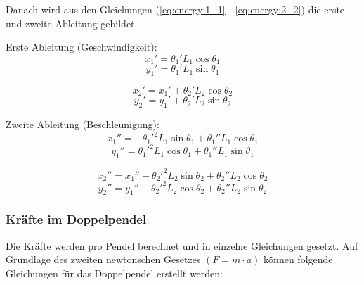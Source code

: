 \documentclass[12pt]{article}
\numberwithin{equation}{subsection}
\begin{document}
Danach wird aus den Gleichungen (\ref{eq:energy:1_1} - \ref{eq:energy:2_2}) die erste und zweite Ableitung gebildet.

Erste Ableitung (Geschwindigkeit):
\begin{equation} \label{eq:velocity:1_1}
	x_1' = \theta_1' L_1\cos\theta_1
\end{equation}
\begin{equation} \label{eq:velocity:1_2}
	y_1' = \theta_1' L_1\sin\theta_1
\end{equation}

\begin{equation} \label{eq:velocity:2_1}
	x_2' = x_1' + \theta_2' L_2\cos\theta_2
\end{equation}
\begin{equation} \label{eq:velocity:2_2}
	y_2' = y_1' + \theta_2' L_2\sin\theta_2
\end{equation}

Zweite Ableitung (Beschleunigung):
\begin{equation} \label{eq:acceleration:1_1}
	x_1'' = -{\theta_1'}^2 L_1 \sin\theta_1 + \theta_1'' L_1 \cos\theta_1
\end{equation}
\begin{equation} \label{eq:acceleration:1_2}
	y_1'' = {\theta_1'}^2 L_1 \cos\theta_1 + \theta_1'' L_1 \sin\theta_1
\end{equation}

\begin{equation} \label{eq:acceleration:2_1}
	x_2'' = x_1'' - {\theta_2'}^2 L_2\sin\theta_2 + \theta_2'' L_2 \cos\theta_2
\end{equation}
\begin{equation} \label{eq:acceleration:2_2}
	y_2'' = y_1'' + {\theta_2'}^2 L_2\cos\theta_2 + \theta_2'' L_2 \sin\theta_2
\end{equation}

\subsubsection{Kräfte im Doppelpendel}
Die Kräfte werden pro Pendel berechnet und in einzelne Gleichungen gesetzt. Auf Grundlage des zweiten newtonschen Gesetzes $(F = m \cdot a)$ können folgende Gleichungen für das Doppelpendel erstellt werden:
\end{document}
